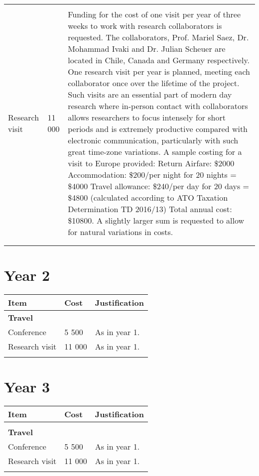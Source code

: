 \documentclass[12pt]{amsart}
\begin{document}
\begin{center}
\begin{longtable}{|p{}|p{}|p{}|}
 &  & \\
Research visit & 11 000 & Funding for the cost of one visit per year of three weeks to work with research collaborators is requested. The collaborators, Prof. Mariel Saez, Dr. Mohammad Ivaki and Dr. Julian Scheuer are located in Chile, Canada and Germany respectively. One research visit per year is planned, meeting each collaborator once over the lifetime of the project. Such visits are an essential part of modern day research where in-person contact with collaborators allows researchers to focus intensely for short periods and is extremely productive compared with electronic communication, particularly with such great time-zone variations. A sample costing for a visit to Europe provided: Return Airfare: \$2000  Accommodation: \$200/per night for 20 nights = \$4000  Travel allowance: \$240/per day for 20 days = \$4800 (calculated according to ATO Taxation Determination TD 2016/13)  Total annual cost: \$10800. A slightly larger sum is requested to allow for natural variations in costs.\\
 &  & \\
 &  & \\
\hline
\end{longtable}
\end{center}


\section*{Year 2}
\label{sec:orgheadline2}
\begin{center}
\begin{longtable}{|p{}|p{}|p{}|}
\hline
Item & Cost & Justification\\
\hline
\textbf{Travel} &  & \\
Conference & 5 500 & As in year 1.\\
Research visit & 11 000 & As in year 1.\\
 &  & \\
\hline
\end{longtable}
\end{center}


\section*{Year 3}
\label{sec:orgheadline3}
\begin{center}
\begin{longtable}{|p{}|p{}|p{}|}
\hline
Item & Cost & Justification\\
\hline
 &  & \\
\textbf{Travel} &  & \\
Conference & 5 500 & As in year 1.\\
Research visit & 11 000 & As in year 1.\\
 &  & \\
\hline
\end{longtable}
\end{center}
\end{document}
